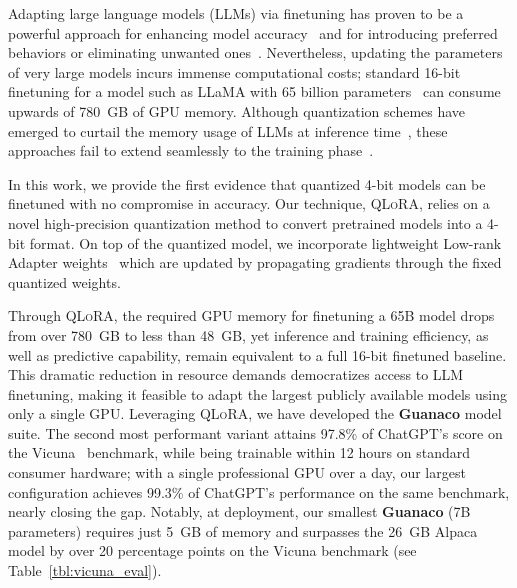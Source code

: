Adapting large language models (LLMs) via finetuning has proven to be a powerful approach for enhancing model accuracy~\citep{min2021metaicl, wei2021finetuned, ouyang2022training, wang2022super, wang2022self, liu2022few} and for introducing preferred behaviors or eliminating unwanted ones~\citep{ouyang2022training,askell2021general,bai2022training}. Nevertheless, updating the parameters of very large models incurs immense computational costs; standard 16-bit finetuning for a model such as LLaMA with 65 billion parameters~\citep{touvron2023llama} can consume upwards of 780~GB of GPU memory. Although quantization schemes have emerged to curtail the memory usage of LLMs at inference time~\citep{dettmers2022llm, dettmers2022case, frantar2022gptq, xiao2022smoothquant}, these approaches fail to extend seamlessly to the training phase~\citep{wortsman2023stable}.

In this work, we provide the first evidence that quantized 4-bit models can be finetuned with no compromise in accuracy. Our technique, \textsc{QLoRA}, relies on a novel high-precision quantization method to convert pretrained models into a 4-bit format. On top of the quantized model, we incorporate lightweight Low-rank Adapter weights~\citep{hu2021lora} which are updated by propagating gradients through the fixed quantized weights.

Through \textsc{QLoRA}, the required GPU memory for finetuning a 65B model drops from over 780~GB to less than 48~GB, yet inference and training efficiency, as well as predictive capability, remain equivalent to a full 16-bit finetuned baseline. This dramatic reduction in resource demands democratizes access to LLM finetuning, making it feasible to adapt the largest publicly available models using only a single GPU. Leveraging \textsc{QLoRA}, we have developed the \textbf{Guanaco} model suite. The second most performant variant attains 97.8\% of ChatGPT’s score on the Vicuna~\citep{vicuna2023} benchmark, while being trainable within 12 hours on standard consumer hardware; with a single professional GPU over a day, our largest configuration achieves 99.3\% of ChatGPT’s performance on the same benchmark, nearly closing the gap. Notably, at deployment, our smallest \textbf{Guanaco} (7B parameters) requires just 5~GB of memory and surpasses the 26~GB Alpaca model by over 20 percentage points on the Vicuna benchmark (see Table~\ref{tbl:vicuna_eval}).

